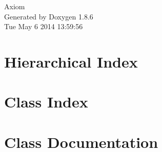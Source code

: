\documentclass[twoside]{book}
\newcommand{\clearemptydoublepage}{%
  \newpage{\pagestyle{empty}\cleardoublepage}%
}
\begin{document}
\hypersetup{pageanchor=false}
\begin{titlepage}
\vspace*{7cm}
\begin{center}%
{\Large Axiom }\\
\vspace*{1cm}
{\large Generated by Doxygen 1.8.6}\\
\vspace*{0.5cm}
{\small Tue May 6 2014 13:59:56}\\
\end{center}
\end{titlepage}
\clearemptydoublepage
\tableofcontents
\clearemptydoublepage
{}
\hypersetup{pageanchor=true}

\chapter{Hierarchical Index}

\chapter{Class Index}

\chapter{Class Documentation}














































\newpage
{}
{}
\printindex
\end{document}
